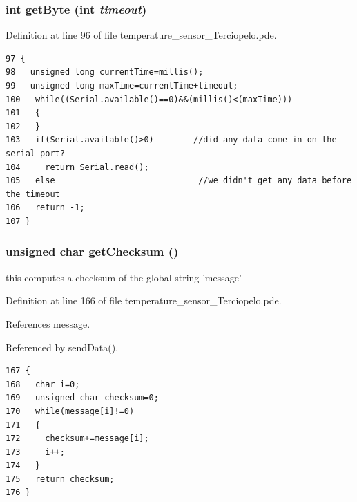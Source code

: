 \hypertarget{temperature__sensor___terciopelo_8pde_f8c68e93feeba5b9244094043672bac0}{
\subsubsection[{getByte}]{\setlength{\rightskip}{0pt plus 5cm}int getByte (int {\em timeout})}}
\label{temperature__sensor___terciopelo_8pde_f8c68e93feeba5b9244094043672bac0}




Definition at line 96 of file temperature\_\-sensor\_\-Terciopelo.pde.

\begin{Code}\begin{verbatim}97 {
98   unsigned long currentTime=millis();
99   unsigned long maxTime=currentTime+timeout;
100   while((Serial.available()==0)&&(millis()<(maxTime)))
101   {
102   }
103   if(Serial.available()>0)        //did any data come in on the serial port?
104     return Serial.read();
105   else                             //we didn't get any data before the timeout
106   return -1;
107 }
\end{verbatim}
\end{Code}


\hypertarget{temperature__sensor___terciopelo_8pde_465a79dc430d1e52a5b540920da744ca}{
\subsubsection[{getChecksum}]{\setlength{\rightskip}{0pt plus 5cm}unsigned char getChecksum ()}}
\label{temperature__sensor___terciopelo_8pde_465a79dc430d1e52a5b540920da744ca}


this computes a checksum of the global string 'message' 



Definition at line 166 of file temperature\_\-sensor\_\-Terciopelo.pde.

References message.

Referenced by sendData().

\begin{Code}\begin{verbatim}167 {
168   char i=0;
169   unsigned char checksum=0;
170   while(message[i]!=0)
171   {
172     checksum+=message[i];
173     i++;
174   }
175   return checksum;
176 }
\end{verbatim}
\end{Code}


